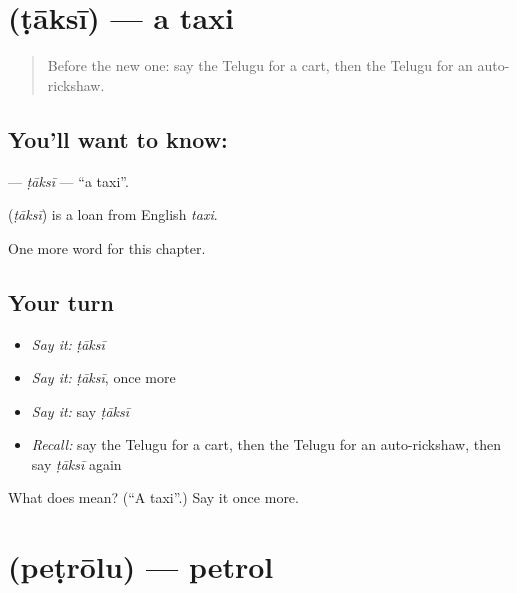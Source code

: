 \section[\texorpdfstring{\te{టాక్సీ} (ṭāksī)}{టాక్సీ (ṭāksī)}]{ (ṭāksī) — a taxi}

\label{lesson:TE-C301-taksi}



\begin{quote}
Before the new one: say the Telugu for a cart, then the Telugu for an auto-rickshaw.
\end{quote}

\subsection*{You'll want to know: }
\textbf{} — \emph{ṭāksī} — \textquotedblleft{}a taxi\textquotedblright{}.

\begin{cousinweb}
\textbf{} (\emph{ṭāksī}) is a loan from English \emph{taxi}.
\end{cousinweb}

\begin{grammarlens}[title={What you've built}]
One more word for this chapter.
\end{grammarlens}

\subsection*{Your turn}
\begin{itemize}
\raggedright
  \item \emph{Say it:} \emph{ṭāksī}
  \item \emph{Say it:} \emph{ṭāksī}, once more
  \item \emph{Say it:} say \emph{ṭāksī}
  \item \emph{Recall:} say the Telugu for a cart, then the Telugu for an auto-rickshaw, then say \emph{ṭāksī} again
\end{itemize}

\begin{tcolorbox}[breakable,colback=teal!4,colframe=teal!35!black,title={Before you move on}]
What does  mean? (\textquotedblleft{}A taxi\textquotedblright{}.) Say it once more.
\end{tcolorbox}
\section[\texorpdfstring{\te{పెట్రోలు} (peṭrōlu)}{పెట్రోలు (peṭrōlu)}]{ (peṭrōlu) — petrol}

